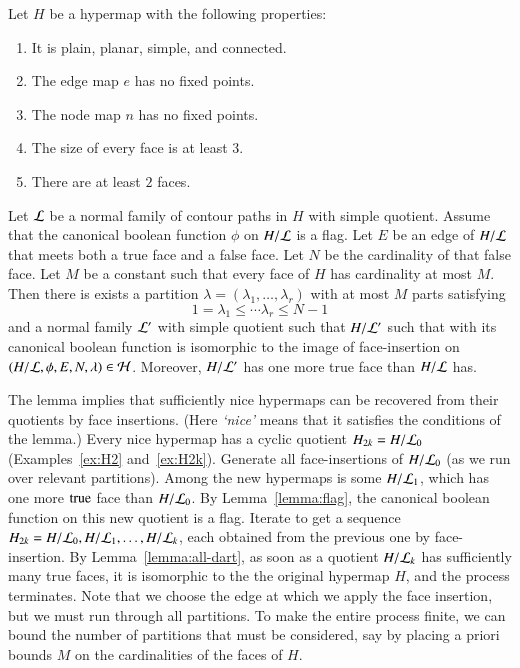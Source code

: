 \begin{theorem}  Let $H$ be a hypermap with the following properties:
    \begin{enumerate}
        \item It is plain, planar, simple, and connected.
        \item The edge map $e$ has no fixed points.
        \item The node map $n$ has no fixed points.
        \item The size of every face is at least $3$.
        \item There are at least $2$ faces. 
    \end{enumerate}
Let $\cal L$ be a normal family of contour paths in $H$ with
simple quotient. Assume that
the canonical boolean function $\phi$ on $H/{\cal L}$ is a flag. Let
$E$ be an edge of $H/{\cal L}$ that meets both a true face
and a false face. Let $N$ be the cardinality of that false face. Let
$M$ be a constant such that every face of $H$ has cardinality at
most $M$. Then there is exists a partition $\lambda=(\lambda_1,\ldots,\lambda_r)$ with at most
$M$ parts satisfying $$1=\lambda_1\le \cdots\lambda_r \le N-1$$
and a normal family
${\cal L}'$ with simple quotient such that $H/{\cal L}'$  such that
with its canonical boolean
function is isomorphic to the image of face-insertion on
$(H/{\cal L},\phi,E,N,\lambda)\in {\cal H}$. 
Moreover, $H/{\cal L}'$
has one more true face than $H/{\cal L}$ has.
\end{theorem}

\begin{remark}
\label{remark:nice-algorithm} 
The lemma implies that sufficiently nice hypermaps can be recovered
from their quotients by face insertions.  (Here {\it `nice'} means
that it satisfies the conditions of the lemma.)  
Every nice hypermap has a cyclic quotient 
$H_{2k}=H/{\cal L}_0$
(Examples~\ref{ex:H2} and~\ref{ex:H2k}).
Generate all face-insertions of $H/{\cal L}_0$ 
(as we run over relevant partitions).
Among the new hypermaps is some $H/{\cal L}_1$, which
has one more ${\operatorname{true}}$ face than $H/{\cal L}_0$.  By 
Lemma~\ref{lemma:flag}, 
the canonical boolean function on this new quotient
is a flag.  Iterate to get a sequence
$H_{2k} = H/{\cal L}_0, H/{\cal L}_1,\ldots, H/{\cal L}_k$,
each obtained from the previous one by face-insertion.
By Lemma~\ref{lemma:all-dart}, 
as
soon as a quotient $H/{\cal L}_k$ 
has sufficiently many true faces, it is
isomorphic to the the original hypermap $H$, and the process
terminates.
Note that we choose the edge at which we apply the face
insertion, but we must run through
all partitions.  To make the entire process finite, we can bound the
number of partitions that must be considered, say by placing a
priori bounds $M$ on the cardinalities of the faces of $H$.
\end{remark}


